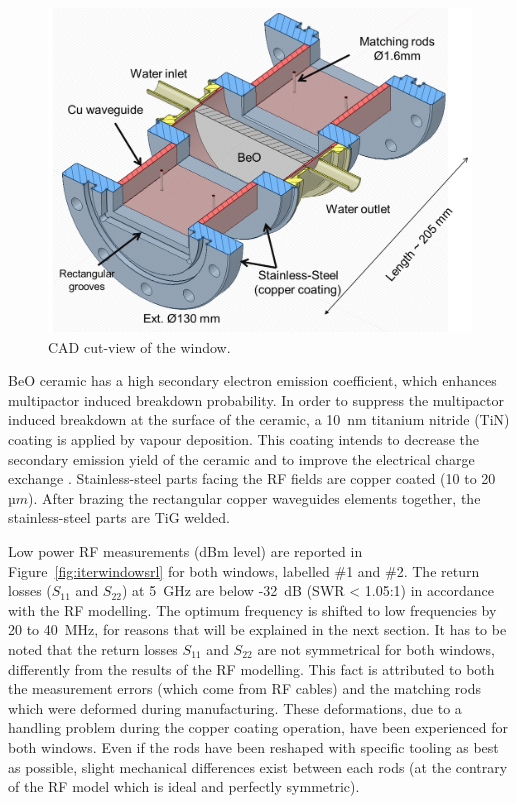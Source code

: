 \begin{figure}
	\centering
	\includegraphics[width=1.0\linewidth]{figures/chap3/ITER_window/ITER_windows_geometry}
	\caption{CAD cut-view of the window.}
	\label{fig:iterwindowsgeometry}
\end{figure}

BeO ceramic has a high secondary electron emission coefficient, which enhances multipactor induced breakdown probability. In order to suppress the multipactor induced breakdown at the surface of the ceramic, a 10~\si{nm} titanium nitride (TiN) coating is applied by vapour deposition. This coating intends to decrease the secondary emission yield of the ceramic and to improve the electrical charge exchange  . Stainless-steel parts facing the RF fields are copper coated (10 to 20~$\si{µm}$).  After brazing the rectangular copper waveguides elements together, the stainless-steel parts are TiG welded. 

Low power RF measurements (dBm level) are reported in Figure~\ref{fig:iterwindowsrl} for both windows, labelled \#1 and \#2. The return losses ($S_{11}$ and $S_{22}$) at 5~GHz are below -32~dB (SWR < 1.05:1) in accordance with the RF modelling. The optimum frequency is shifted to low frequencies by 20 to 40~MHz, for reasons that will be explained in the next section. It has to be noted that the return losses $S_{11}$ and $S_{22}$ are not symmetrical for both windows, differently from the results of the RF modelling. This fact is attributed to both the measurement errors (which come from RF cables) and the matching rods which were deformed during manufacturing. These deformations, due to a handling problem during the copper coating operation, have been experienced for both windows. Even if the rods have been reshaped with specific tooling as best as possible, slight mechanical differences exist between each rods (at the contrary of the RF model which is ideal and perfectly symmetric). 


